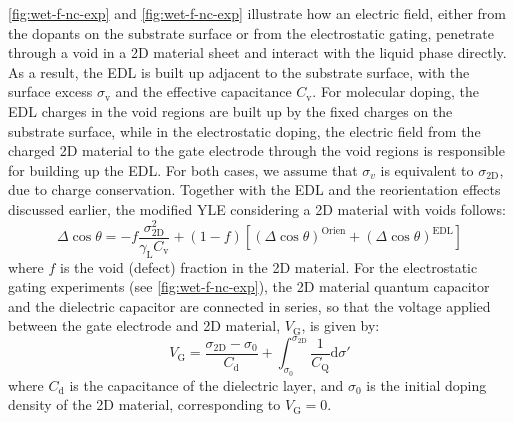 \autoref{fig:wet-f-nc-exp} and \autoref{fig:wet-f-nc-exp} illustrate how
an electric field, either from the dopants on the substrate surface or
from the electrostatic gating, penetrate through a void in a 2D
material sheet and interact with the liquid phase directly. As a
result, the EDL is built up adjacent to the substrate surface, with
the surface excess \(\sigma_{\mathrm{v}}\) and the effective
capacitance \(C_{\mathrm{v}}\).  For molecular doping, the EDL charges
in the void regions are built up by the fixed charges on the substrate
surface, while in the electrostatic doping, the electric field from
the charged 2D material to the gate electrode through the void regions
is responsible for building up the EDL. For both cases, we assume that
\(\sigma_{v}\) is equivalent to \(\sigma_{\mathrm{2D}}\), due to
charge conservation. Together with the EDL and the reorientation
effects discussed earlier, the modified YLE considering a 2D material
with voids follows:
\begin{equation}
\label{eqn:wet-def-Delta-cos-mixture}
\Delta \cos \theta = -f\frac{\sigma_{\mathrm{2D}}^{2}}{\gamma_{\mathrm{L}} C_{\mathrm{v}}} 
                     + (1-f)[(\Delta \cos \theta)^{\mathrm{Orien}} + (\Delta \cos \theta)^{\mathrm{EDL}}]
\end{equation}
where \(f\) is the void (defect) fraction in the 2D material. For the
electrostatic gating experiments (see 
\autoref{fig:wet-f-nc-exp}), the 2D material quantum capacitor
and the dielectric  capacitor are connected in
series, so that the voltage applied between the gate electrode and
2D material, \(V_{\mathrm{G}}\), is given by:
\begin{equation}
\label{eqn:wet-VG-gating}
V_{\mathrm{G}} = \frac{\sigma_{\mathrm{2D}} - \sigma_{\mathrm{0}}}{C_{\mathrm{d}}}
                  + \int_{\sigma_{0}}^{\sigma_{\mathrm{2D}}} \frac{1}{C_{\mathrm{Q}}} \mathrm{d}\sigma'
\end{equation}
where \(C_{\mathrm{d}}\) is the capacitance of the dielectric layer, and
\(\sigma_{0}\) is the initial doping density of the 2D material,
corresponding to \(V_{\mathrm{G}}=0\).


